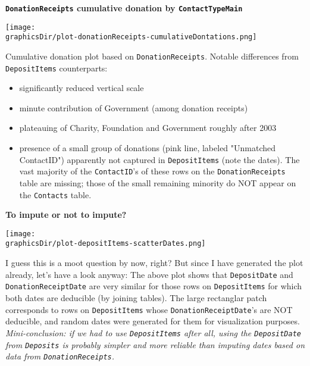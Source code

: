 \begin{frame}{\large\bf \texttt{DonationReceipts} cumulative donation by \texttt{ContactTypeMain}}
\tiny

\vskip 0.5cm
\begin{center}
\texttt{[image: \\graphicsDir/plot-donationReceipts-cumulativeDontations.png]}
\end{center}

\begin{flushleft}
Cumulative donation plot based on \texttt{DonationReceipts}.
Notable differences from \texttt{DepositItems} counterparts:
\begin{itemize}
\item	significantly reduced vertical scale
\item	minute contribution of Government (among donation receipts)
\item	plateauing of Charity, Foundation and Government roughly after 2003
\item	presence of a small group of donations (pink line, labeled "Unmatched ContactID") apparently not
	captured in \texttt{DepositItems} (note the dates).
	The vast majority of the \texttt{ContactID}'s of these rows on the \texttt{DonationReceipts} table are missing;
	those of the small remaining minority do NOT appear on the \texttt{Contacts} table.
\end{itemize}
\vskip 0.5cm
\mbox{}
\end{flushleft}
\end{frame}
\normalsize

\begin{frame}{\bf To impute or not to impute?}
\tiny

\vskip 0.4cm

\begin{center}
\texttt{[image: \\graphicsDir/plot-depositItems-scatterDates.png]}
\end{center}

\begin{flushleft}
\vskip -0.2cm
I guess this is a moot question by now, right? But since I have generated the plot already, let's have a look anyway:
The above plot shows that \texttt{DepositDate} and \texttt{DonationReceiptDate} are very similar
for those rows on \texttt{DepositItems} for which both dates are deducible (by joining tables).
The large rectanglar patch corresponds to rows on \texttt{DepositItems} whose \texttt{DonationReceiptDate}'s
are NOT deducible, and random dates were generated for them for visualization purposes.
\textit{Mini-conclusion: if we had to use \texttt{DepositItems} after all, using the \texttt{DepositDate} from \texttt{Deposits}
is probably simpler and more reliable than imputing dates based on data from \texttt{DonationReceipts}.}
\end{flushleft}

\end{frame}

